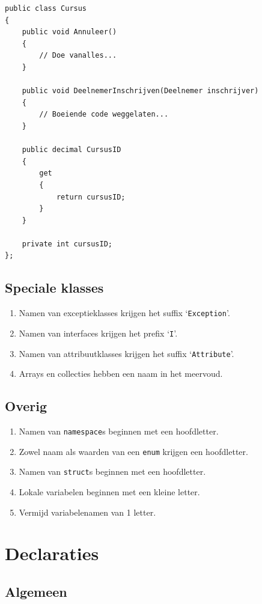 \documentclass[a4paper,11pt]{article}
\begin{document}
\begin{lstlisting}[float,caption=Naamgeving klasses]
public class Cursus
{
	public void Annuleer()
	{
		// Doe vanalles...
	}

	public void DeelnemerInschrijven(Deelnemer inschrijver)
	{
		// Boeiende code weggelaten...
	}

	public decimal CursusID
	{
		get
		{
			return cursusID;
		}
	}

	private int cursusID;
};
\end{lstlisting}

\subsection{Speciale klasses}

\begin{enumerate}[resume]
\item Namen van exceptieklasses krijgen het suffix `\lstinline !Exception!'.
\item Namen van interfaces krijgen het prefix `\lstinline !I!'.
\item Namen van attribuutklasses krijgen het suffix `\lstinline !Attribute!'.
\item Arrays en collecties hebben een naam in het meervoud.
\end{enumerate}

\subsection{Overig}

\begin{enumerate}[resume]
\item Namen van \lstinline !namespace!s beginnen met een hoofdletter.
\item Zowel naam als waarden van een \lstinline !enum! krijgen een hoofdletter.
\item Namen van \lstinline !struct!s beginnen met een hoofdletter.
\item Lokale variabelen beginnen met een kleine letter.
\item Vermijd variabelenamen van 1 letter.
\end{enumerate}

\section{Declaraties}

\subsection{Algemeen}
\end{document}
